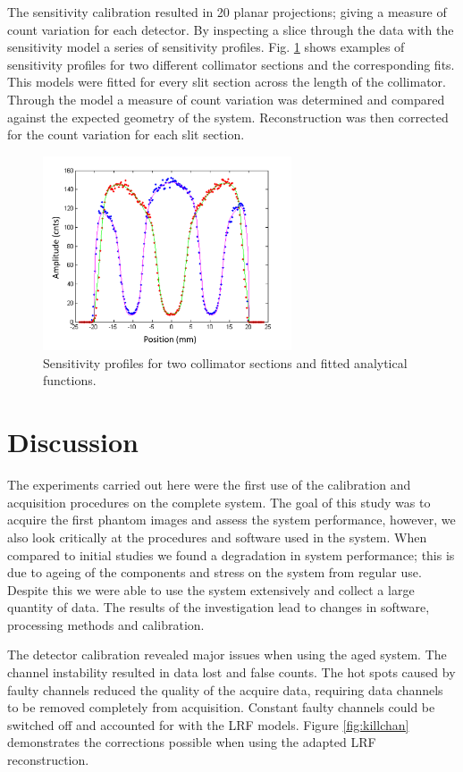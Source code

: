The sensitivity calibration resulted in 20 planar projections; giving a measure of count variation for each detector. By inspecting a slice through the data with the sensitivity model a series of sensitivity profiles. Fig. \ref{fig_sensprof} shows examples of sensitivity profiles for two different collimator sections and the corresponding fits. This models were fitted for every slit section across the length of the collimator. Through the model a measure of count variation was determined and compared against the expected geometry of the system. Reconstruction was then corrected for the count variation for each slit section. 

\begin{figure}[!t]
\centering
\includegraphics[width=2.9in]{figures/sns_prof.png}
\caption{Sensitivity profiles for two collimator sections and fitted analytical functions.}
\label{fig_sensprof}
\end{figure}

\section{Discussion}
The experiments carried out here were the first use of the calibration and acquisition procedures on the complete system. The goal of this study was to acquire the first phantom images and assess the system performance, however, we also look critically at the procedures and software used in the system. When compared to initial studies \cite{8432104} we found a degradation in system performance; this is due to ageing of the components and stress on the system from regular use. Despite this we were able to use the system extensively and collect a large quantity of data. The results of the investigation lead to changes in software, processing methods and calibration. 

The detector calibration revealed major issues when using the aged system. The channel instability resulted in data lost and false counts. The hot spots caused by faulty channels reduced the quality of the acquire data, requiring data channels to be removed completely from acquisition. Constant faulty channels could be switched off and accounted for with the \acrshort{LRF} models. Figure \ref{fig:killchan} demonstrates the corrections possible when using the adapted \acrshort{LRF} reconstruction. 

